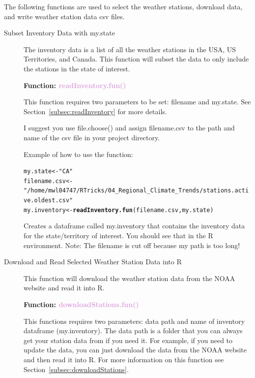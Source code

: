 \documentclass{article}\usepackage[]{graphicx}\usepackage[dvipsnames]{xcolor}
\makeatletter
\newcommand{\hlstr}[1]{\textcolor[rgb]{0.192,0.494,0.8}{#1}}%
\newcommand{\hlstd}[1]{\textcolor[rgb]{0.345,0.345,0.345}{#1}}%
\newcommand{\hlkwb}[1]{\textcolor[rgb]{0.69,0.353,0.396}{#1}}%
\newcommand{\hlkwd}[1]{\textcolor[rgb]{0.737,0.353,0.396}{\textbf{#1}}}%
\newenvironment{kframe}{%
 \def\at@end@of@kframe{}%
 \ifinner\ifhmode%
  \def\at@end@of@kframe{\end{minipage}}%
  \begin{minipage}{\columnwidth}%
 \fi\fi%
 \def\FrameCommand##1{\hskip\@totalleftmargin \hskip-\fboxsep
 \colorbox{shadecolor}{##1}\hskip-\fboxsep
     \hskip-\linewidth \hskip-\@totalleftmargin \hskip\columnwidth}%
 \MakeFramed {\advance\hsize-\width
   \@totalleftmargin\z@ \linewidth\hsize
   \@setminipage}}%
 {\par\unskip\endMakeFramed%
 \at@end@of@kframe}
\newenvironment{knitrout}{}{} %
\makeatother
\begin{document}
The following functions are used to select the weather stations, download data, and write weather station data csv files.

\begin{description}

\item[Subset Inventory Data with my.state]  The inventory data is a list of all the weather stations in the USA, US Territories, and Canada. This function will subset the data to only include the stations in the state of interest.

\begin{center}
\textbf{Function: \textcolor{Plum}{readInventory.fun()}}
\end{center}

This function requires two parameters to be set: filename and my.state. See Section~\ref{subsec:readInventory} for more details.

I suggest you use file.choose() and assign filename.csv to the path and name of the csv file in your project directory.  

Example of how to use the function:

\begin{knitrout}
\color{fgcolor}\begin{kframe}
\begin{alltt}
\hlstd{my.state} \hlkwb{<-} \hlstr{"CA"}
\hlstd{filename.csv} \hlkwb{<-}
  \hlstr{"/home/mwl04747/RTricks/04_Regional_Climate_Trends/stations.active.oldest.csv"}
\hlstd{my.inventory} \hlkwb{<-} \hlkwd{readInventory.fun}\hlstd{(filename.csv, my.state)}
\end{alltt}
\end{kframe}
\end{knitrout}

Creates a dataframe called my.inventory that contains the inventory data for the state/territory of interest. You should see that in the R environment. Note: The filename is cut off because my path is too long!

\item[Download and Read Selected Weather Station Data into R] This function will download the weather station data from the NOAA website and read it into R.

\begin{center}
\textbf{Function: \textcolor{Plum}{downloadStations.fun()}}
\end{center}

This functions requires two parameters: data path and name of inventory dataframe (my.inventory). The data path is a folder that you can always get your station data from if you need it. For example, if you need to update the data, you can just download the data from the NOAA website and then read it into R. For more information on this function see Section~\ref{subsec:downloadStations}.


\end{description}
\end{document}
